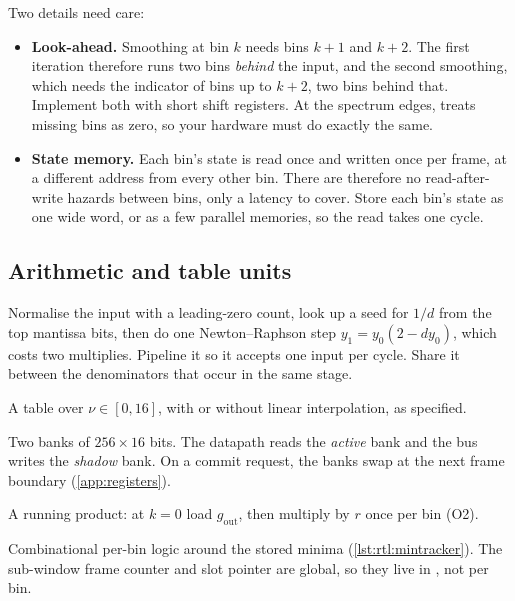 Two details need care:
\begin{itemize}
  \item \textbf{Look-ahead.} Smoothing at bin $k$ needs bins $k+1$ and $k+2$. The
  first iteration therefore runs two bins \emph{behind} the input, and the second
  smoothing, which needs the indicator of bins up to $k+2$, two bins behind
  that. Implement both with short shift registers. At the spectrum edges,
   treats missing bins as zero, so your
  hardware must do exactly the same.
  \item \textbf{State memory.} Each bin's state is read once and written once per
  frame, at a different address from every other bin. There are therefore no
  read-after-write hazards between bins, only a latency to cover. Store each
  bin's state as one wide word, or as a few parallel memories, so the read takes
  one cycle.
\end{itemize}

\subsection{Arithmetic and table units}

\begin{description}[style=nextline,leftmargin=1.2em]
  \item[\texttt{recip\_unit}] Normalise the input with a leading-zero count, look
  up a seed for $1/d$ from the top mantissa bits, then do one Newton--Raphson
  step $y_1=y_0(2-dy_0)$, which costs two multiplies. Pipeline it so it accepts
  one input per cycle. Share it between the denominators that occur in the same
  stage.
  \item[\texttt{exp\_unit}] A table over $\nu\in[0,16]$, with or without linear
  interpolation, as specified.
  \item[\texttt{gain\_lut}] Two banks of $256\times16$ bits. The datapath reads
  the \emph{active} bank and the bus writes the \emph{shadow} bank. On a commit
  request, the banks swap at the next frame boundary (\cref{app:registers}).
  \item[\texttt{tilt\_gain}] A running product: at $k=0$ load
  $g_\text{out}$, then multiply by $r$ once per bin (O2).
  \item[\texttt{min\_tracker}] Combinational per-bin logic around the stored
  minima (\cref{lst:rtl:mintracker}). The sub-window frame counter and slot
  pointer are global, so they live in , not per bin.
\end{description}

